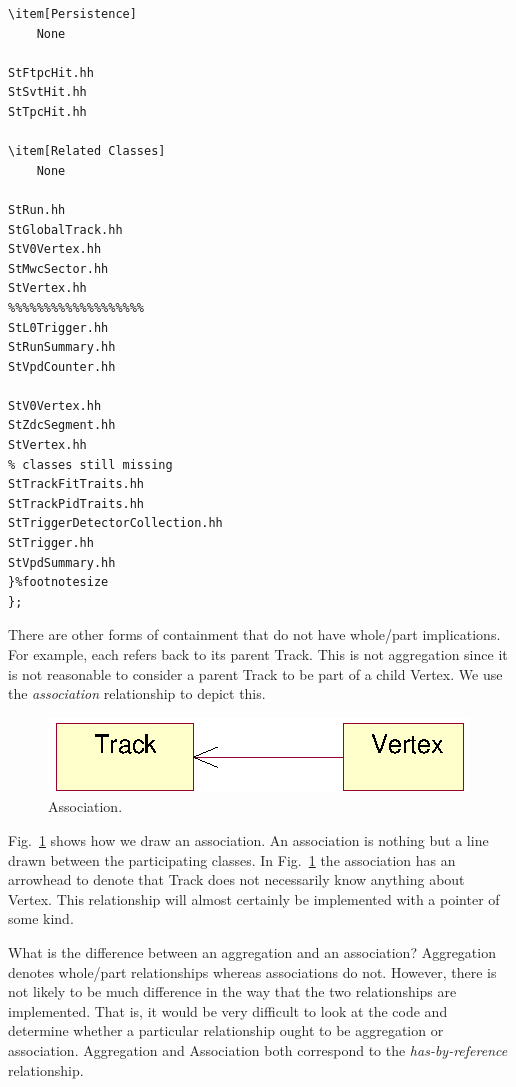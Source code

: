 \begin{Entry}
\begin{Entry}
{\begin{verbatim}
\item[Persistence]
    None

StFtpcHit.hh
StSvtHit.hh
StTpcHit.hh

\item[Related Classes]
    None

StRun.hh
StGlobalTrack.hh
StV0Vertex.hh
StMwcSector.hh
StVertex.hh
%%%%%%%%%%%%%%%%%%%
StL0Trigger.hh
StRunSummary.hh
StVpdCounter.hh

StV0Vertex.hh
StZdcSegment.hh
StVertex.hh
% classes still missing
StTrackFitTraits.hh
StTrackPidTraits.hh
StTriggerDetectorCollection.hh
StTrigger.hh
StVpdSummary.hh
}%footnotesize    
};
\end{verbatim}
}%

There are other forms of containment that do not have whole/part
implications. For example, each  refers back to its
parent Track. This is not aggregation since it is not reasonable to
consider a parent Track to be part of a child Vertex. We use the
\emph{association} relationship to depict this.

\begin{figure}[htb]
    \begin{center}
        \includegraphics{umlAssociation.eps}
        \caption{Association.}
        \label{fig:umlAssociation}
    \end{center}
\end{figure}

Fig.~\ref{fig:umlAssociation} shows how we draw an association.  An
association is nothing but a line drawn between the participating
classes. In Fig.~\ref{fig:umlAssociation} the association has an
arrowhead to denote that Track does not necessarily know anything
about Vertex. This relationship will almost certainly be implemented
with a pointer of some kind.

What is the difference between an aggregation and an association?
Aggregation denotes whole/part relationships whereas associations do
not. However, there is not likely to be much difference in the way
that the two relationships are implemented.  That is, it would be very
difficult to look at the code and determine whether a particular
relationship ought to be aggregation or association.  Aggregation and
Association both correspond to the \emph{has-by-reference}
relationship.


\end{Entry}
\end{Entry}
